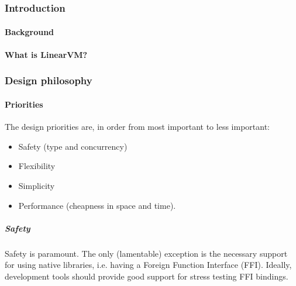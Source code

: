\documentclass[a4paper]{book}
\begin{document}
\tableofcontents
\part{}

\section{Introduction}

\subsection{Background}


\subsection{What is LinearVM?}

\section{Design philosophy}

\subsection{Priorities}

The design priorities are, in order from most important to less important:

\begin{itemize}
\item Safety (type and concurrency)
\item Flexibility
\item Simplicity
\item Performance (cheapness in space and time).
\end{itemize}

\subsubsection*{Safety}
Safety is paramount. The only (lamentable) exception is the
necessary support for using native libraries, i.e. having a Foreign
Function Interface (FFI). Ideally, development tools should provide
good support for stress testing FFI bindings.
\end{document}
